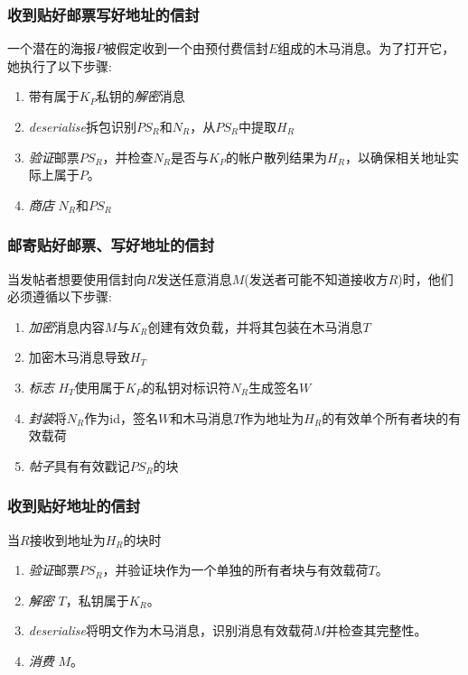 \subsubsection{收到贴好邮票写好地址的信封}

一个潜在的海报$P$被假定收到一个由预付费信封$E$组成的木马消息。为了打开它，她执行了以下步骤:

\begin{enumerate}
    \item 带有属于$K_P$私钥的\emph{解密}消息
    \item \emph{deserialise}拆包识别$PS_R$和$N_R$，从$PS_R$中提取$H_R$
    \item \emph{验证}邮票$PS_R$，并检查$N_R$是否与$K_P$的帐户散列结果为$H_R$，以确保相关地址实际上属于$P$。
    \item \emph{商店} $N_R$和$PS_R$ 
\end{enumerate}

\subsubsection{邮寄贴好邮票、写好地址的信封}

当发帖者想要使用信封向$R$发送任意消息$M$(发送者可能不知道接收方$R$)时，他们必须遵循以下步骤:

\begin{enumerate}
\item \emph{加密}消息内容$M$与$K_R$创建有效负载，并将其包装在木马消息$T$
\item 加密木马消息导致$H_T$
\item \emph{标志} $H_T$使用属于$K_P$的私钥对标识符$N_R$生成签名$W$
\item \emph{封装}将$N_R$作为id，签名$W$和木马消息$T$作为地址为$H_R$的有效单个所有者块的有效载荷
\item \emph{帖子}具有有效戳记$PS_R$的块
\end{enumerate}

\subsubsection{收到贴好地址的信封}

当$R$接收到地址为$H_R$的块时

\begin{enumerate}
\item \emph{验证}邮票$PS_R$，并验证块作为一个单独的所有者块与有效载荷$T$。
\item \emph{解密} $T$，私钥属于$K_R$。
\item \emph{deserialise}将明文作为木马消息，识别消息有效载荷$M$并检查其完整性。
\item \emph{消费} $M$。
\end{enumerate}

